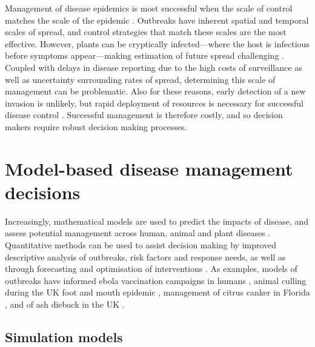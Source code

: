 Management of disease epidemics is most successful when the scale of control matches the scale of the epidemic \citep{gilligan_impact_2007}. Outbreaks have inherent spatial and temporal scales of spread, and control strategies that match these scales are the most effective. However, plants can be cryptically infected---where the host is infectious before symptoms appear---making estimation of future spread challenging \citep{thompson_detecting_2016}. Coupled with delays in disease reporting due to the high costs of surveillance \citep{parnell_generic_2014} as well as uncertainty surrounding rates of spread, determining this scale of management can be problematic. Also for these reasons, early detection of a new invasion is unlikely, but rapid deployment of resources is necessary for successful disease control \citep{cunniffe_optimising_2015}. Successful management is therefore costly, and so decision makers require robust decision making processes.

\section{Model-based disease management decisions}

Increasingly, mathematical models are used to predict the impacts of disease, and assess potential management across human, animal and plant diseases \citep{thompson_preface_2019}. Quantitative methods can be used to assist decision making by improved descriptive analysis of outbreaks, risk factors and response needs, as well as through forecasting and optimisation of interventions \citep{morgan_decision_2019}. As examples, models of outbreaks have informed ebola vaccination campaigns in humans \citep{bellan_statistical_2015}, animal culling during the UK foot and mouth epidemic \citep{keeling_dynamics_2001}, management of citrus canker in Florida \citep{gottwald_post_2007}, and of ash dieback in the UK \citep{defra_chalara_2013}.

\subsection{Simulation models}

